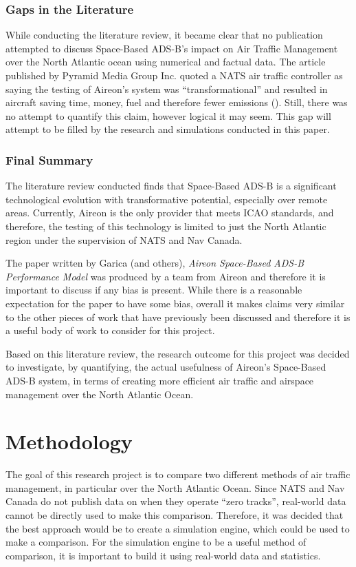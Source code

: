 \documentclass[stu, a4paper, 12pt, floatsintext]{apa7}
\numberwithin{figure}{section}
\numberwithin{table}{section}
\numberwithin{equation}{section}
\begin{document}
\subsubsection{Gaps in the Literature}
While conducting the literature review, it became clear that no publication attempted to discuss Space-Based ADS-B’s impact on Air Traffic Management over the North Atlantic ocean using numerical and factual data. The article published by Pyramid Media Group Inc. quoted a NATS air traffic controller as saying the testing of Aireon’s system was “transformational” and resulted in aircraft saving time, money, fuel and therefore fewer emissions (\cite{SpaceBasedADSBChangesFlying}). Still, there was no attempt to quantify this claim, however logical it may seem. This gap will attempt to be filled by the research and simulations conducted in this paper. 
\subsubsection{Final Summary}
The literature review conducted finds that Space-Based ADS-B is a significant technological evolution with transformative potential, especially over remote areas. Currently, Aireon is the only provider that meets ICAO standards, and therefore, the testing of this technology is limited to just the North Atlantic region under the supervision of NATS and Nav Canada. 

The paper written by Garica (and others), \textit{Aireon Space-Based ADS-B Performance Model} was produced by a team from Aireon and therefore it is important to discuss if any bias is present. While there is a reasonable expectation for the paper to have some bias, overall it makes claims very similar to the other pieces of work that have previously been discussed and therefore it is a useful body of work to consider for this project. 

Based on this literature review, the research outcome for this project was decided to investigate, by quantifying, the actual usefulness of Aireon’s Space-Based ADS-B system, in terms of creating more efficient air traffic and airspace management over the North Atlantic Ocean. 

\newpage
\section{Methodology}
The goal of this research project is to compare two different methods of air traffic management, in particular over the North Atlantic Ocean. Since NATS and Nav Canada do not publish data on when they operate “zero tracks”, real-world data cannot be directly used to make this comparison. Therefore, it was decided that the best approach would be to create a simulation engine, which could be used to make a comparison. For the simulation engine to be a useful method of comparison, it is important to build it using real-world data and statistics.
\end{document}
